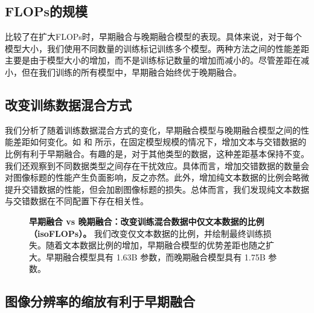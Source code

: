 \subsection{FLOPs的规模}  比较了在扩大FLOPs时，早期融合与晚期融合模型的表现。具体来说，对于每个模型大小，我们使用不同数量的训练标记训练多个模型。两种方法之间的性能差距主要是由于模型大小的增加，而不是训练标记数量的增加而减小的。尽管差距在减小，但在我们训练的所有模型中，早期融合始终优于晚期融合。
\subsection{改变训练数据混合方式}  
我们分析了随着训练数据混合方式的变化，早期融合模型与晚期融合模型之间的性能差距如何变化。如  和  所示，在固定模型规模的情况下，增加文本与交错数据的比例有利于早期融合。有趣的是，对于其他类型的数据，这种差距基本保持不变。我们还观察到不同数据类型之间存在干扰效应。具体而言，增加交错数据的数量会对图像标题的性能产生负面影响，反之亦然。此外，增加纯文本数据的比例会略微提升交错数据的性能，但会加剧图像标题的损失。总体而言，我们发现纯文本数据与交错数据在不同配置下存在相关性。

\begin{figure}[htp]
    \centering
    \captionsetup{type=figure}
    \begin{subfigure}[t]{0.33\linewidth}
        
    \end{subfigure}
    \begin{subfigure}[t]{0.32\linewidth}
        
    \end{subfigure}
    \begin{subfigure}[t]{0.32\linewidth}
        
    \end{subfigure}

    \vspace{0.3cm}
    \caption{\textbf{早期融合 vs 晚期融合：改变训练混合数据中仅文本数据的比例（isoFLOPs）。} 我们改变仅文本数据的比例，并绘制最终训练损失。随着文本数据比例的增加，早期融合模型的优势差距也随之扩大。早期融合模型具有 1.63B 参数，而晚期融合模型具有 1.75B 参数。}
    \label{fig:early_vs_late_textratio}
\end{figure}


\subsection{图像分辨率的缩放有利于早期融合}


